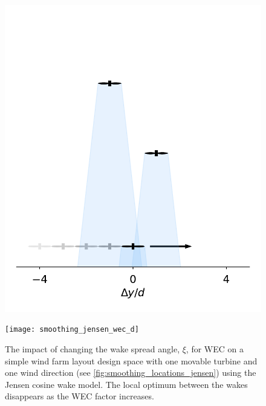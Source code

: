 \documentclass[a4paper]{jpconf}
\begin{document}
\begin{figure}[ht]
	\centering
	\begin{minipage}[t]{0.43\textwidth}
		\centering
		\includegraphics[width=\textwidth, trim={-0.5cm -0.5cm -0.5cm 3.25cm}, clip]{final_images/layouts/3turb-design-space}
		\caption{Simple wind farm, seen from above, used to demonstrate the effects of the WEC factor $\xi$, on the wind farm layout design space (see \cref{fig:smoothing_jensen_wec_d}). Wind is from the top.}
		\label{fig:smoothing_locations_jensen}
	\end{minipage}\hspace{1pc}
	\begin{minipage}[t]{0.52\textwidth}
		\centering
		\texttt{[image: smoothing\_jensen\_wec\_d]}
		\caption{The impact of changing the wake spread angle, $\xi$, for WEC on a simple wind farm layout design space with one movable turbine and one wind direction (see \cref{fig:smoothing_locations_jensen}) using the Jensen cosine wake model. The local optimum between the wakes disappears as the WEC factor increases.}
		\label{fig:smoothing_jensen_wec_d}
	\end{minipage}
\end{figure}
\end{document}

